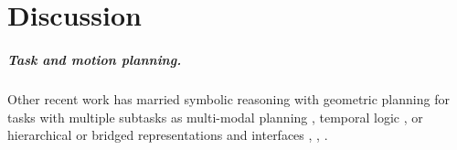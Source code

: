 \chapter{Discussion}

\paragraph{Task and motion planning.}
Other recent work has married symbolic reasoning with geometric planning
for tasks with multiple subtasks
as multi-modal planning \citep{hauser2010multi},
temporal logic \citep{bhatia2010temporalgoals},
or hierarchical or bridged representations and interfaces
\citep{cambon2009hybrid}, \citep{gravot2005asymov},
\citep{srivastava2014taskmotion}.


